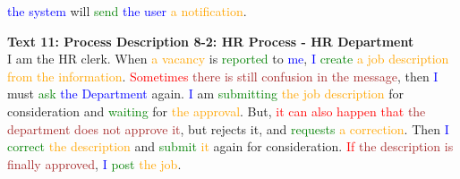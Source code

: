 \textcolor{blue}{the} \textcolor{blue}{system} will \textcolor{green}{send} \textcolor{blue}{the} \textcolor{blue}{user} \textcolor{orange}{a} \textcolor{orange}{notification}.

\textbf{Text 11: Process Description 8-2: HR Process - HR Department}\\
I am the HR clerk. When \textcolor{orange}{a} \textcolor{orange}{vacancy} is \textcolor{green}{reported} to \textcolor{blue}{me}, \textcolor{blue}{I} \textcolor{green}{create} \textcolor{orange}{a} \textcolor{orange}{job} \textcolor{orange}{description} \textcolor{orange}{from} \textcolor{orange}{the} \textcolor{orange}{information}. \textcolor{red}{Sometimes} \textcolor{brown}{there} \textcolor{brown}{is} \textcolor{brown}{still} \textcolor{brown}{confusion} \textcolor{brown}{in} \textcolor{brown}{the} \textcolor{brown}{message}, then \textcolor{blue}{I} must \textcolor{green}{ask} \textcolor{blue}{the} \textcolor{blue}{Department} again. \textcolor{blue}{I} am \textcolor{green}{submitting} \textcolor{orange}{the} \textcolor{orange}{job} \textcolor{orange}{description} for consideration and \textcolor{green}{waiting} for \textcolor{orange}{the} \textcolor{orange}{approval}. But, \textcolor{red}{it} \textcolor{red}{can} \textcolor{red}{also} \textcolor{red}{happen} \textcolor{red}{that} \textcolor{brown}{the} \textcolor{brown}{department} \textcolor{brown}{does} \textcolor{brown}{not} \textcolor{brown}{approve} \textcolor{brown}{it}, but rejects it, and \textcolor{green}{requests} \textcolor{orange}{a} \textcolor{orange}{correction}. Then \textcolor{blue}{I} \textcolor{green}{correct} \textcolor{orange}{the} \textcolor{orange}{description} and \textcolor{green}{submit} \textcolor{orange}{it} again for consideration. \textcolor{red}{If} \textcolor{brown}{the} \textcolor{brown}{description} \textcolor{brown}{is} \textcolor{brown}{finally} \textcolor{brown}{approved}, \textcolor{blue}{I} \textcolor{green}{post} \textcolor{orange}{the} \textcolor{orange}{job}.

